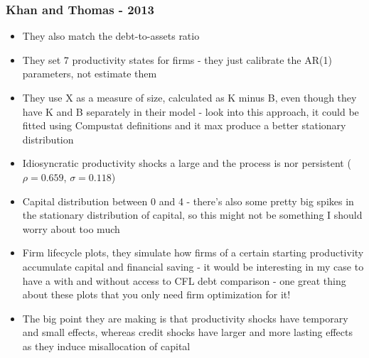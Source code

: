 \documentclass[12pt]{article}
\begin{document}
\subsubsection*{Khan and Thomas - 2013}
\begin{itemize}\setlength\itemsep{0em} \small
    \item They also match the debt-to-assets ratio
    \item They set 7 productivity states for firms - they just calibrate the AR(1) parameters, not estimate them
    \item They use X as a measure of size, calculated as K minus B, even though they have K and B separately in their model - look into this approach, it could be fitted using Compustat definitions and it max produce a better stationary distribution
    \item Idiosyncratic productivity shocks a large and the process is nor persistent ($\rho = 0.659$, $\sigma = 0.118$)
    \item Capital distribution between 0 and 4 - there's also some pretty big spikes in the stationary distribution of capital, so this might not be something I should worry about too much
    \item Firm lifecycle plots, they simulate how firms of a certain starting productivity accumulate capital and financial saving - it would be interesting in my case to have a with and without access to CFL debt comparison - one great thing about these plots that you only need firm optimization for it!
    \item The big point they are making is that productivity shocks have temporary and small effects, whereas credit shocks have larger and more lasting effects as they induce misallocation of capital
\end{itemize} \normalsize
\end{document}
